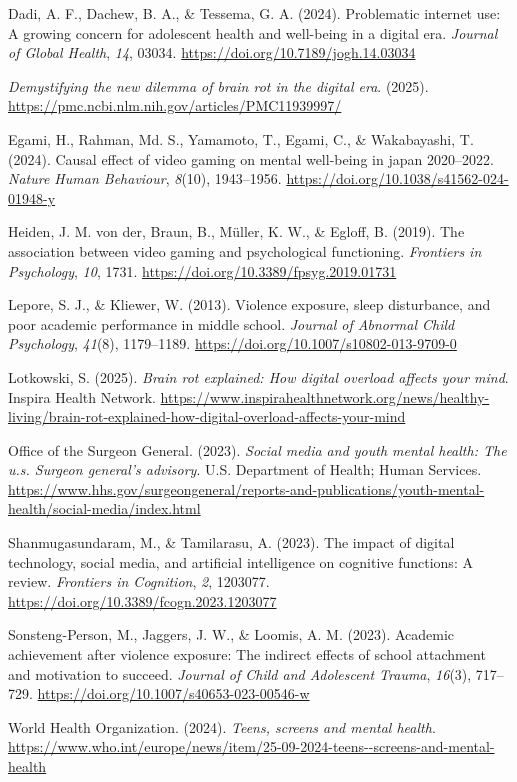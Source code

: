 \documentclass[
  titlepage]{article}
\newlength{\cslhangindent}
\newenvironment{CSLReferences}[2] %
 {\begin{list}{}{%
  \setlength{\itemindent}{0pt}
  \setlength{\leftmargin}{0pt}
  \setlength{\parsep}{0pt}
  \ifodd #1
   \setlength{\leftmargin}{\cslhangindent}
   \setlength{\itemindent}{-1\cslhangindent}
  \fi
  \setlength{\itemsep}{#2\baselineskip}}}
 {\end{list}}
\begin{document}
\label{refs}
\begin{CSLReferences}{1}{0}
Dadi, A. F., Dachew, B. A., \& Tessema, G. A. (2024). Problematic
internet use: A growing concern for adolescent health and well-being in
a digital era. \emph{Journal of Global Health}, \emph{14}, 03034.
\url{https://doi.org/10.7189/jogh.14.03034}

\emph{Demystifying the new dilemma of brain rot in the digital era}.
(2025). \url{https://pmc.ncbi.nlm.nih.gov/articles/PMC11939997/}

Egami, H., Rahman, Md. S., Yamamoto, T., Egami, C., \& Wakabayashi, T.
(2024). Causal effect of video gaming on mental well-being in japan
2020--2022. \emph{Nature Human Behaviour}, \emph{8}(10), 1943--1956.
\url{https://doi.org/10.1038/s41562-024-01948-y}

Heiden, J. M. von der, Braun, B., Müller, K. W., \& Egloff, B. (2019).
The association between video gaming and psychological functioning.
\emph{Frontiers in Psychology}, \emph{10}, 1731.
\url{https://doi.org/10.3389/fpsyg.2019.01731}

Lepore, S. J., \& Kliewer, W. (2013). Violence exposure, sleep
disturbance, and poor academic performance in middle school.
\emph{Journal of Abnormal Child Psychology}, \emph{41}(8), 1179--1189.
\url{https://doi.org/10.1007/s10802-013-9709-0}

Lotkowski, S. (2025). \emph{Brain rot explained: How digital overload
affects your mind}. Inspira Health Network.
\url{https://www.inspirahealthnetwork.org/news/healthy-living/brain-rot-explained-how-digital-overload-affects-your-mind}

Office of the Surgeon General. (2023). \emph{Social media and youth
mental health: The u.s. Surgeon general's advisory}. U.S. Department of
Health; Human Services.
\url{https://www.hhs.gov/surgeongeneral/reports-and-publications/youth-mental-health/social-media/index.html}

Shanmugasundaram, M., \& Tamilarasu, A. (2023). The impact of digital
technology, social media, and artificial intelligence on cognitive
functions: A review. \emph{Frontiers in Cognition}, \emph{2}, 1203077.
\url{https://doi.org/10.3389/fcogn.2023.1203077}

Sonsteng-Person, M., Jaggers, J. W., \& Loomis, A. M. (2023). Academic
achievement after violence exposure: The indirect effects of school
attachment and motivation to succeed. \emph{Journal of Child and
Adolescent Trauma}, \emph{16}(3), 717--729.
\url{https://doi.org/10.1007/s40653-023-00546-w}

World Health Organization. (2024). \emph{Teens, screens and mental
health}.
\url{https://www.who.int/europe/news/item/25-09-2024-teens--screens-and-mental-health}

\end{CSLReferences}
\end{document}
